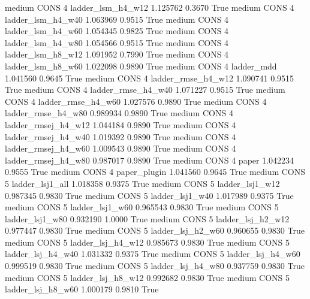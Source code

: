     medium     CONS                 4   ladder_lsm_h4_w12   1.125762      0.3670    True
    medium     CONS                 4   ladder_lsm_h4_w40   1.063969      0.9515    True
    medium     CONS                 4   ladder_lsm_h4_w60   1.054345      0.9825    True
    medium     CONS                 4   ladder_lsm_h4_w80   1.054566      0.9515    True
    medium     CONS                 4   ladder_lsm_h8_w12   1.091952      0.7990    True
    medium     CONS                 4   ladder_lsm_h8_w60   1.022098      0.9890    True
    medium     CONS                 4          ladder_mdd   1.041560      0.9645    True
    medium     CONS                 4  ladder_rmse_h4_w12   1.090741      0.9515    True
    medium     CONS                 4  ladder_rmse_h4_w40   1.071227      0.9515    True
    medium     CONS                 4  ladder_rmse_h4_w60   1.027576      0.9890    True
    medium     CONS                 4  ladder_rmse_h4_w80   0.989934      0.9890    True
    medium     CONS                 4 ladder_rmsej_h4_w12   1.044184      0.9890    True
    medium     CONS                 4 ladder_rmsej_h4_w40   1.019392      0.9890    True
    medium     CONS                 4 ladder_rmsej_h4_w60   1.009543      0.9890    True
    medium     CONS                 4 ladder_rmsej_h4_w80   0.987017      0.9890    True
    medium     CONS                 4               paper   1.042234      0.9555    True
    medium     CONS                 4        paper_plugin   1.041560      0.9645    True
    medium     CONS                 5     ladder_lsj1_all   1.018358      0.9375    True
    medium     CONS                 5     ladder_lsj1_w12   0.987345      0.9830    True
    medium     CONS                 5     ladder_lsj1_w40   1.017989      0.9375    True
    medium     CONS                 5     ladder_lsj1_w60   0.965543      0.9830    True
    medium     CONS                 5     ladder_lsj1_w80   0.932190      1.0000    True
    medium     CONS                 5   ladder_lsj_h2_w12   0.977447      0.9830    True
    medium     CONS                 5   ladder_lsj_h2_w60   0.960655      0.9830    True
    medium     CONS                 5   ladder_lsj_h4_w12   0.985673      0.9830    True
    medium     CONS                 5   ladder_lsj_h4_w40   1.031332      0.9375    True
    medium     CONS                 5   ladder_lsj_h4_w60   0.999519      0.9830    True
    medium     CONS                 5   ladder_lsj_h4_w80   0.937759      0.9830    True
    medium     CONS                 5   ladder_lsj_h8_w12   0.992682      0.9830    True
    medium     CONS                 5   ladder_lsj_h8_w60   1.000179      0.9810    True
